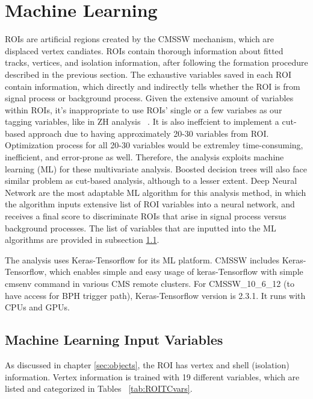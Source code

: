 \clearpage
\chapter{Machine Learning}\label{sec:machinelearning}

ROIs are artificial regions created by the CMSSW mechanism, which are displaced vertex candiates.
ROIs contain thorough information about fitted tracks, vertices, and isolation information, after following the formation procedure described in the previous section. 
The exhaustive variables saved in each ROI contain information, which directly and indirectly tells whether the ROI is from signal process or background process.
Given the extensive amount of variables within ROIs, it's inappropriate to use ROIs' single or a few variabes as our tagging variables, like in ZH analysis ~\cite{ZHAN}.  
It is also ineffcient to implement a cut-based approach due to having approximately 20-30 variables from ROI.
Optimization process for all 20-30 variables would be extremley time-consuming, inefficient, and error-prone as well.
Therefore, the analysis exploits machine learning (ML) for these multivariate analysis.
Boosted decision trees will also face similar problem as cut-based analysis, although to a lesser extent.
Deep Neural Network are the most adaptable ML algorithm for this analysis method, in which the algorithm inputs extensive list of ROI variables into a neural network, and receives a final score to discriminate ROIs that arise in signal process versus background processes. 
The list of variables that are inputted into the ML algorithms are provided in subsection \ref{sec:MLIV}.

The analysis uses Keras-Tensorflow for its ML platform.
CMSSW includes Keras-Tensorflow, which enables simple and easy usage of keras-Tensorflow with simple cmsenv command in various CMS remote clusters. 
For CMSSW\_10\_6\_12 (to have access for BPH trigger path), Keras-Tensorflow version is 2.3.1.
It runs with CPUs and GPUs.

\section{Machine Learning Input Variables}\label{sec:MLIV}
As discussed in chapter \ref{sec:objects}, the ROI has vertex and shell (isolation) information.
Vertex information is trained with 19 different variables, which are listed and categorized in Tables ~\ref{tab:ROITCvars}.

